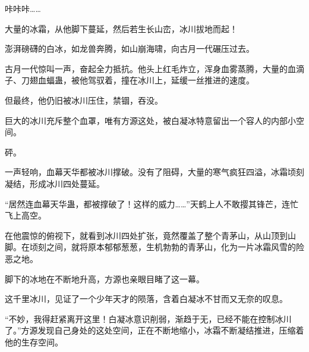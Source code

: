 \begin{this_body}
咔咔咔……

大量的冰霜，从他脚下蔓延，然后若生长山峦，冰川拔地而起！

澎湃磅礴的白冰，如龙兽奔腾，如山崩海啸，向古月一代碾压过去。

古月一代惊叫一声，奋起全力抵抗。他头上红毛炸立，浑身血雾蒸腾，大量的血滴子、刀翅血蝠蛊，被他驾驭着，撞在冰川上，延缓一丝推进的速度。

但最终，他仍旧被冰川压住，禁锢，吞没。

巨大的冰川充斥整个血罩，唯有方源这处，被白凝冰特意留出一个容人的内部小空间。

砰。

一声轻响，血幕天华都被冰川撑破。没有了阻碍，大量的寒气疯狂四溢，冰霜顷刻凝结，形成冰川四处蔓延。

“居然连血幕天华蛊，都被撑破了！这样的威力……”天鹤上人不敢撄其锋芒，连忙飞上高空。

在他震惊的俯视下，就看到冰川四处扩张，竟然覆盖了整个青茅山，从山顶到山脚。在顷刻之间，就将原本郁郁葱葱，生机勃勃的青茅山，化为一片冰霜风雪的险恶之地。

脚下的冰地在不断地升高，方源也亲眼目睹了这一幕。

这千里冰川，见证了一个少年天才的陨落，含着白凝冰不甘而又无奈的叹息。

“不妙，我得赶紧离开这里！白凝冰意识削弱，渐趋于无，已经不能在控制冰川了。”方源发现自己身处的这处空间，正在不断地缩小，冰霜不断凝结推进，压缩着他的生存空间。

\end{this_body}

